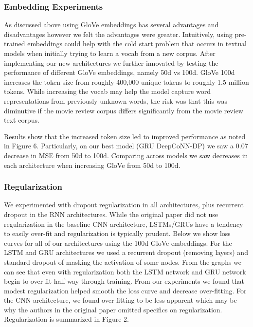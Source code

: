 \documentclass[10pt,twocolumn,letterpaper]{article}
\begin{document}
\subsubsection{Embedding Experiments}
As discussed above using GloVe embeddings has several advantages and disadvantages however we felt the advantages were greater. Intuitively, using pre-trained embeddings could help with the cold start problem that occurs in textual models when initially trying to learn a vocab from a new corpus. After implementing our new architectures we further innovated by testing the performance of different GloVe embeddings, namely 50d vs 100d. GloVe 100d increases the token size from roughly 400,000 unique tokens to roughly 1.5 million tokens. While increasing the vocab may help the model capture word representations from previously unknown words, the risk was that this was diminutive if the movie review corpus differs significantly from the movie review text corpus. 

Results show that the increased token size led to improved performance as noted in Figure 6. Particularly, on our best model (GRU DeepCoNN-DP) we saw a 0.07 decrease in MSE from 50d to 100d. Comparing across models we saw decreases in each architecture when increasing GloVe from 50d to 100d.\\

\subsubsection{Regularization}

We experimented with dropout regularization in all architectures, plus recurrent dropout in the RNN architectures. While the original paper did not use regularization in the baseline CNN architecture, LSTMs/GRUs have a tendency to easily over-fit and regularization is typically prudent. Below we show loss curves for all of our architectures using the 100d GloVe embeddings. For the LSTM and GRU architectures we used a recurrent dropout (removing layers) and standard dropout of masking the activation of some nodes. From the graphs we can see that even with regularization both the LSTM network and GRU network begin to over-fit half way through training. From our experiments we found that modest regularization helped smooth the loss curve and decrease over-fitting. For the CNN architecture, we found over-fitting to be less apparent which may be why the authors in the original paper omitted specifics on regularization. Regularization is summarized in Figure 2.
\end{document}
